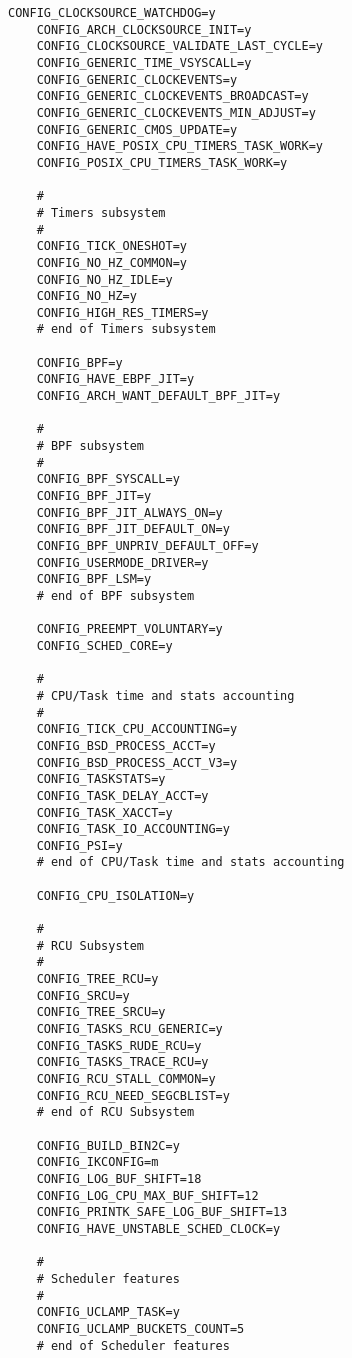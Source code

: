 \begin{multicols}{2}
\begin{lstlisting}[caption=kernel config,label=kconfig,]
    CONFIG_CLOCKSOURCE_WATCHDOG=y
    CONFIG_ARCH_CLOCKSOURCE_INIT=y
    CONFIG_CLOCKSOURCE_VALIDATE_LAST_CYCLE=y
    CONFIG_GENERIC_TIME_VSYSCALL=y
    CONFIG_GENERIC_CLOCKEVENTS=y
    CONFIG_GENERIC_CLOCKEVENTS_BROADCAST=y
    CONFIG_GENERIC_CLOCKEVENTS_MIN_ADJUST=y
    CONFIG_GENERIC_CMOS_UPDATE=y
    CONFIG_HAVE_POSIX_CPU_TIMERS_TASK_WORK=y
    CONFIG_POSIX_CPU_TIMERS_TASK_WORK=y
    
    #
    # Timers subsystem
    #
    CONFIG_TICK_ONESHOT=y
    CONFIG_NO_HZ_COMMON=y
    CONFIG_NO_HZ_IDLE=y
    CONFIG_NO_HZ=y
    CONFIG_HIGH_RES_TIMERS=y
    # end of Timers subsystem
    
    CONFIG_BPF=y
    CONFIG_HAVE_EBPF_JIT=y
    CONFIG_ARCH_WANT_DEFAULT_BPF_JIT=y
    
    #
    # BPF subsystem
    #
    CONFIG_BPF_SYSCALL=y
    CONFIG_BPF_JIT=y
    CONFIG_BPF_JIT_ALWAYS_ON=y
    CONFIG_BPF_JIT_DEFAULT_ON=y
    CONFIG_BPF_UNPRIV_DEFAULT_OFF=y
    CONFIG_USERMODE_DRIVER=y
    CONFIG_BPF_LSM=y
    # end of BPF subsystem
    
    CONFIG_PREEMPT_VOLUNTARY=y
    CONFIG_SCHED_CORE=y
    
    #
    # CPU/Task time and stats accounting
    #
    CONFIG_TICK_CPU_ACCOUNTING=y
    CONFIG_BSD_PROCESS_ACCT=y
    CONFIG_BSD_PROCESS_ACCT_V3=y
    CONFIG_TASKSTATS=y
    CONFIG_TASK_DELAY_ACCT=y
    CONFIG_TASK_XACCT=y
    CONFIG_TASK_IO_ACCOUNTING=y
    CONFIG_PSI=y
    # end of CPU/Task time and stats accounting
    
    CONFIG_CPU_ISOLATION=y
    
    #
    # RCU Subsystem
    #
    CONFIG_TREE_RCU=y
    CONFIG_SRCU=y
    CONFIG_TREE_SRCU=y
    CONFIG_TASKS_RCU_GENERIC=y
    CONFIG_TASKS_RUDE_RCU=y
    CONFIG_TASKS_TRACE_RCU=y
    CONFIG_RCU_STALL_COMMON=y
    CONFIG_RCU_NEED_SEGCBLIST=y
    # end of RCU Subsystem
    
    CONFIG_BUILD_BIN2C=y
    CONFIG_IKCONFIG=m
    CONFIG_LOG_BUF_SHIFT=18
    CONFIG_LOG_CPU_MAX_BUF_SHIFT=12
    CONFIG_PRINTK_SAFE_LOG_BUF_SHIFT=13
    CONFIG_HAVE_UNSTABLE_SCHED_CLOCK=y
    
    #
    # Scheduler features
    #
    CONFIG_UCLAMP_TASK=y
    CONFIG_UCLAMP_BUCKETS_COUNT=5
    # end of Scheduler features
    

\end{lstlisting}
\end{multicols}

